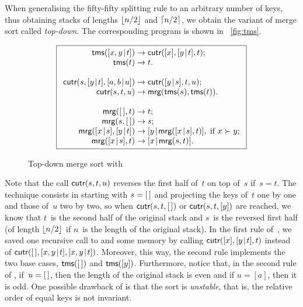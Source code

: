 When generalising the fifty\hyp{}fifty splitting rule to an arbitrary
number of keys, thus obtaining stacks of lengths \(\lfloor{n/2}\rfloor\) and
\(\lceil{n/2}\rceil\), we obtain the variant of merge sort called
\emph{top\hyp{}down}. The corresponding program is shown in
\fig~\vref{fig:tms}.
\begin{figure}[!b]
\begin{equation*}
\boxed{%
\begin{array}{r@{\;}l@{\;}l}
\fun{tms}(\cons{x,y}{t}) & \rightarrow
                         & \fun{cutr}([x],\cons{y}{t},t);\\
\fun{tms}(t)             & \rightarrow & t.\\
\\
\fun{cutr}(s,\cons{y}{t},\cons{a,b}{u})
                       & \rightarrow & \fun{cutr}(\cons{y}{s},t,u);\\
\fun{cutr}(s,t,u)        & \rightarrow
                         & \fun{mrg}(\fun{tms}(s),\fun{tms}(t)).\\
\\
\fun{mrg}(\el,t)         & \rightarrow & t;\\
\fun{mrg}(s,\el)         & \rightarrow & s;\\
\fun{mrg}(\cons{x}{s},\cons{y}{t}) & \rightarrow
                         & \cons{y}{\fun{mrg}(\cons{x}{s},t)},\;
                           \text{if \(x \succ y\)};\\
\fun{mrg}(\cons{x}{s},t) & \rightarrow & \cons{x}{\fun{mrg}(s,t)}.
\end{array}}
\end{equation*}
\caption{Top-down merge sort with }
\label{fig:tms}
\end{figure}
Note that the call \(\textsf{cutr}(s,t,u)\)
reverses the first half of~\(t\) on top of~\(s\) if~\(s=t\). The
technique consists in starting with \(s=[\,]\) and projecting the keys
of~\(t\) one by one and those of~\(u\) two by two, so when
\(\textsf{cutr}(s,t,[\,])\) or \(\textsf{cutr}(s,t,[y])\) are reached, we
know that \(t\)~is the second half of the original stack and \(s\)~is
the reversed first half (of length \(\lfloor{n/2}\rfloor\) if \(n\)~is the
length of the original stack). In the first rule of~, we
saved one recursive call to  and some memory by calling
\(\textsf{cutr}([x],[{y}\!\mid\!{t}], t)\) instead of
\(\textsf{cutr}([\,],[{x,y}\!\mid\!{t}],[{x,y}\!\mid\!{t}])\). Moreover, this way,
the second rule implements the two base cases, \(\textsf{tms}([\,])\) and
\(\textsf{tms}([y])\). Furthermore, notice that, in the second rule of
, if~\(u = [\,]\), then the length of the original stack is
even and if \(u = [a]\), then it is odd. One possible drawback of
 is that the sort is
\emph{unstable}, that is, the relative order of equal keys is not
invariant.

